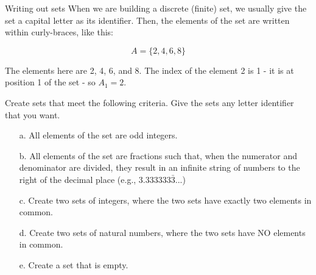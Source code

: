\documentclass[a4paper,12pt]{book}
\newcounter{question}
\begin{document}
        \newpage

        \begin{intro}{Writing out sets}
            When we are building a discrete (finite) set,
            we usually give the set a capital letter as its
            identifier. Then, the elements of the set are written
            within curly-braces, like this:

            $$ A = \{ 2, 4, 6, 8 \} $$

            The elements here are 2, 4, 6, and 8.
            The index of the element 2 is 1 - it is
            at position 1 of the set - so $A_1 = 2$.
        \end{intro}


        \begin{questionNOGRADE}{\thequestion}

            Create sets that meet the following criteria.
            Give the sets any letter identifier that you want.

            \begin{enumerate}
                \item[a.]   All elements of the set are odd integers.
                    \solution{}{ ~\\~\\ }

                \item[b.]   All elements of the set are fractions
                    such that, when the numerator and denominator are divided, they result in
                    an infinite string of numbers to the right
                    of the decimal place (e.g., $3.333333\bar{3}$...)
                    \solution{}{ ~\\~\\ }

                \item[c.]   Create two sets of integers, where
                    the two sets have exactly two elements in common.
                    \solution{}{ ~\\~\\ }

                \item[d.]   Create two sets of natural numbers,
                    where the two sets have NO elements in common.
                    \solution{}{ ~\\~\\ }

                \item[e.]   Create a set that is empty.
                    \solution{}{ ~\\~\\ }
            \end{enumerate}

        \end{questionNOGRADE}
\end{document}
